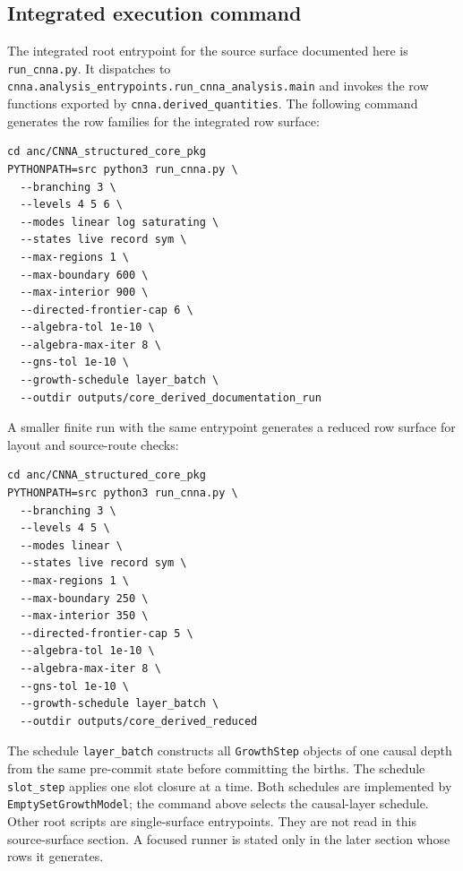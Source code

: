 \documentclass[11pt]{article}
\theoremstyle{remark}
\newcommand{\code}[1]{\texttt{#1}}
\numberwithin{equation}{section}
\begin{document}
\subsection{Integrated execution command}
The integrated root entrypoint for the source surface documented here is \code{run\_cnna.py}. It dispatches to \code{cnna.analysis\_\allowbreak{}entrypoints.run\_\allowbreak{}cnna\_\allowbreak{}analysis.main} and invokes the row functions exported by \code{cnna.derived\_\allowbreak{}quantities}. The following command generates the row families for the integrated row surface:
\begin{verbatim}
cd anc/CNNA_structured_core_pkg
PYTHONPATH=src python3 run_cnna.py \
  --branching 3 \
  --levels 4 5 6 \
  --modes linear log saturating \
  --states live record sym \
  --max-regions 1 \
  --max-boundary 600 \
  --max-interior 900 \
  --directed-frontier-cap 6 \
  --algebra-tol 1e-10 \
  --algebra-max-iter 8 \
  --gns-tol 1e-10 \
  --growth-schedule layer_batch \
  --outdir outputs/core_derived_documentation_run
\end{verbatim}
A smaller finite run with the same entrypoint generates a reduced row surface for layout and source-route checks:
\begin{verbatim}
cd anc/CNNA_structured_core_pkg
PYTHONPATH=src python3 run_cnna.py \
  --branching 3 \
  --levels 4 5 \
  --modes linear \
  --states live record sym \
  --max-regions 1 \
  --max-boundary 250 \
  --max-interior 350 \
  --directed-frontier-cap 5 \
  --algebra-tol 1e-10 \
  --algebra-max-iter 8 \
  --gns-tol 1e-10 \
  --growth-schedule layer_batch \
  --outdir outputs/core_derived_reduced
\end{verbatim}
The schedule \code{layer\_\allowbreak{}batch} constructs all \code{GrowthStep} objects of one causal depth from the same pre-commit state before committing the births. The schedule \code{slot\_\allowbreak{}step} applies one slot closure at a time. Both schedules are implemented by \code{EmptySetGrowthModel}; the command above selects the causal-layer schedule. Other root scripts are single-surface entrypoints. They are not read in this source-surface section. A focused runner is stated only in the later section whose rows it generates.
\end{document}
